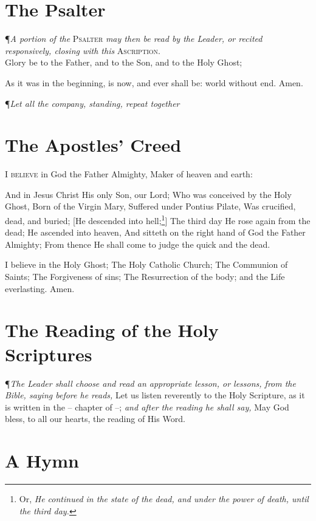 \section*{The Psalter}

\P \textit{A portion of the} \textsc{Psalter} \textit{may then be read by the Leader, or recited responsively, closing with this} \textsc{Ascription.} \\

Glory be to the Father, and to the Son, and to the Holy Ghost; \par
As it was in the beginning, is now, and ever shall be: world without end. Amen. \\

{\centering \P \textit{Let all the company, standing, repeat together} \par} 

\section*{The Apostles' Creed}

\lettrine{I}{ believe} in God the Father Almighty, Maker of heaven and earth: \par
And in Jesus Christ His only Son, our Lord; Who was conceived by the Holy Ghost, Born of the Virgin Mary, Suffered under Pontius Pilate, Was crucified, dead, and buried; [He descended into hell;\footnote{Or, \textit{He continued in the state of the dead, and under the power of death, until the third day.}}]
The third day He rose again from the dead; He ascended into heaven, And sitteth on the right hand of God the Father Almighty; From thence He shall come to judge the quick and the dead. \par
I believe in the Holy Ghost; The Holy Catholic Church; The Communion of Saints; The Forgiveness of sins; The Resurrection of the body; and the Life everlasting. Amen.

\section*{The Reading of the Holy Scriptures}

\P \textit{The Leader shall choose and read an appropriate lesson, or lessons, from the Bible, saying before he reads,} Let us listen reverently to the Holy Scripture, as it is written in the -- chapter of --; \textit{and after the reading he shall say,} May God bless, to all our hearts, the reading of His Word.

\section*{A Hymn}  

